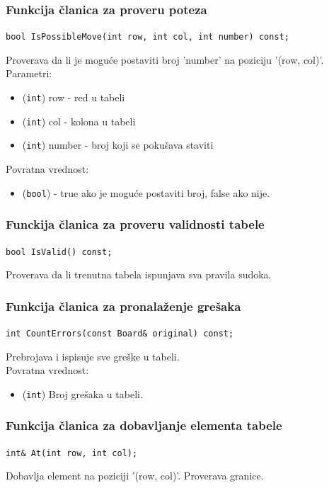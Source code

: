 \documentclass[a4paper]{article}
\begin{document}
    \subsubsection{Funkcija članica za proveru poteza}
    \texttt{bool IsPossibleMove(int row, int col, int number) const;}
    \par Proverava da li je moguće postaviti broj 'number' na poziciju '(row, col)'.\\
    Parametri:
    \begin{itemize}
        \item (\texttt{int}) row - red u tabeli
        \item (\texttt{int}) col - kolona u tabeli
        \item (\texttt{int}) number - broj koji se pokušava staviti
    \end{itemize}
    Povratna vrednost:
    \begin{itemize}
        \item (\texttt{bool}) - true ako je moguće postaviti broj, false ako nije.
    \end{itemize}

    \subsubsection{Funckija članica za proveru validnosti tabele}
    \texttt{bool IsValid() const;}
    \par Proverava da li trenutna tabela ispunjava sva pravila sudoka.
    
    \subsubsection{Funkcija članica za pronalaženje grešaka}
    \texttt{int CountErrors(const Board\& original) const;}
    \par Prebrojava i ispisuje sve greške u tabeli.\\
    Povratna vrednost:
    \begin{itemize}
        \item (\texttt{int}) Broj grešaka u tabeli.
    \end{itemize}

    \subsubsection{Funkcija članica za dobavljanje elementa tabele}
    \texttt{int\& At(int row, int col);}
    \par Dobavlja element na poziciji '(row, col)'. Proverava granice.
    
\end{document}
